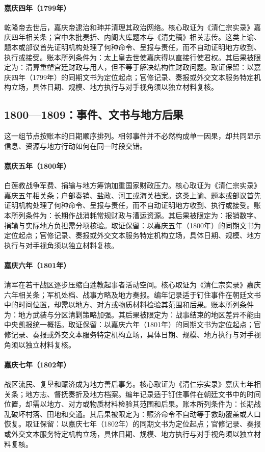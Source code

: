 \hypertarget{ledger:EQ-1799-HESHEN-PURGE}{}\paragraph{嘉庆四年（1799年）}乾隆帝去世后，嘉庆帝逮治和珅并清理其政治网络。核心取证为《清仁宗实录》嘉庆四年相关条；宫中朱批奏折、内阁大库题本与《清史稿》相关志传。这类上谕、题本或部议首先证明机构处理了何种命令、呈报与责任，而不自动证明地方收到、执行或接受。账本所列条件为：太上皇去世使嘉庆得以直接行使君权。其后果被限定为：清算重塑宫廷财政与用人，但不等于解决结构性财政问题。取证保留：以嘉庆四年（1799年）的同期文书为定位起点；官修记录、奏报或外交文本服务特定机构立场，具体日期、规模、地方执行与对手视角须以独立材料复核。
\subsection{1800—1809：事件、文书与地方后果}
这一组节点按账本的日期顺序排列。相邻事件并不必然构成单一因果，却共同显示信息、资源与地方行动如何在同一时段交错。
\hypertarget{ledger:EQ-1800-WHITE-LOTUS-FINANCE}{}\paragraph{嘉庆五年（1800年）}白莲教战争军费、捐输与地方筹饷加重国家财政压力。核心取证为《清仁宗实录》嘉庆五年相关条；户部奏销、盐政、河工或海关档案。这类上谕、题本或部议首先证明机构处理了何种命令、呈报与责任，而不自动证明地方收到、执行或接受。账本所列条件为：长期作战消耗常规财政与漕运资源。其后果被限定为：报销数字、捐输与实际地方负担需分项核验。取证保留：以嘉庆五年（1800年）的同期文书为定位起点；官修记录、奏报或外交文本服务特定机构立场，具体日期、规模、地方执行与对手视角须以独立材料复核。
\hypertarget{ledger:EQ-1801-WHITE-LOTUS-SUPPRESSION}{}\paragraph{嘉庆六年（1801年）}清军在若干战区逐步压缩白莲教起事者活动空间。核心取证为《清仁宗实录》嘉庆六年相关条；军机处档、战事方略及地方奏报。编年记录适于钉住事件在朝廷文书中的时间位置，却需以地方、对方或物质材料检验其范围和后果。账本所列条件为：地方武装与分区清剿策略加强。其后果被限定为：战事结束的地区差异不能由中央凯报统一概括。取证保留：以嘉庆六年（1801年）的同期文书为定位起点；官修记录、奏报或外交文本服务特定机构立场，具体日期、规模、地方执行与对手视角须以独立材料复核。
\hypertarget{ledger:EQ-1802-WAR-REFUGEE-RELIEF}{}\paragraph{嘉庆七年（1802年）}战区流民、复垦和赈济成为地方善后事务。核心取证为《清仁宗实录》嘉庆七年相关条；地方志、督抚奏折及地方档案。编年记录适于钉住事件在朝廷文书中的时间位置，却需以地方、对方或物质材料检验其范围和后果。账本所列条件为：长期战乱破坏村落、田地和交通。其后果被限定为：赈济命令不自动等于救助覆盖或人口恢复。取证保留：以嘉庆七年（1802年）的同期文书为定位起点；官修记录、奏报或外交文本服务特定机构立场，具体日期、规模、地方执行与对手视角须以独立材料复核。
